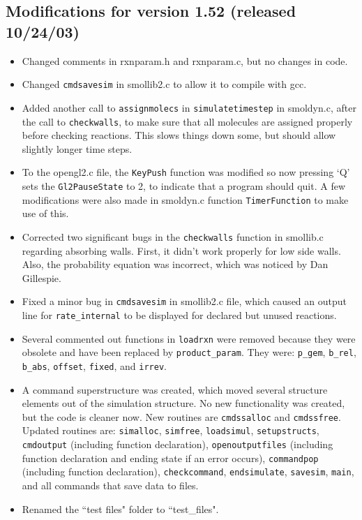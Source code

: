 \documentclass {scrbook}
\newcommand {\ttt} {\texttt}
\begin{document}
\subsection{Modifications for version 1.52 (released 10/24/03)}
\begin{itemize}
\item Changed comments in rxnparam.h and rxnparam.c, but no changes in code.
\item Changed \ttt{cmdsavesim} in smollib2.c to allow it to compile with gcc.
\item Added another call to \ttt{assignmolecs} in \ttt{simulatetimestep} in smoldyn.c, after the call to \ttt{checkwalls}, to make sure that all molecules are assigned properly before checking reactions. This slows things down some, but should allow slightly longer time steps.
\item To the opengl2.c file, the \ttt{KeyPush} function was modified so now pressing `Q' sets the \ttt{Gl2PauseState} to 2, to indicate that a program should quit. A few modifications were also made in smoldyn.c function \ttt{TimerFunction} to make use of this.
\item Corrected two significant bugs in the \ttt{checkwalls} function in smollib.c regarding absorbing walls. First, it didn't work properly for low side walls. Also, the probability equation was incorrect, which was noticed by Dan Gillespie.
\item Fixed a minor bug in \ttt{cmdsavesim} in smollib2.c file, which caused an output line for \ttt{rate\_internal} to be displayed for declared but unused reactions.
\item Several commented out functions in \ttt{loadrxn} were removed because they were obsolete and have been replaced by \ttt{product\_param}. They were: \ttt{p\_gem}, \ttt{b\_rel}, \ttt{b\_abs}, \ttt{offset}, \ttt{fixed}, and \ttt{irrev}.
\item A command superstructure was created, which moved several structure elements out of the simulation structure. No new functionality was created, but the code is cleaner now. New routines are \ttt{cmdssalloc} and \ttt{cmdssfree}. Updated routines are: \ttt{simalloc}, \ttt{simfree}, \ttt{loadsimul}, \ttt{setupstructs}, \ttt{cmdoutput} (including function declaration), \ttt{openoutputfiles} (including function declaration and ending state if an error occurs), \ttt{commandpop} (including function declaration), \ttt{checkcommand}, \ttt{endsimulate}, \ttt{savesim}, \ttt{main}, and all commands that save data to files.
\item Renamed the ``test files" folder to ``test\_files".
\end{itemize}
\end{document}
